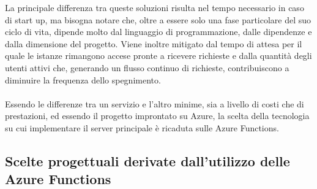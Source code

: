 La principale differenza tra queste soluzioni
risulta nel tempo necessario in caso di start up,
ma bisogna notare che,
oltre a essere solo una fase particolare del suo ciclo di vita,
dipende molto dal linguaggio di programmazione,
dalle dipendenze e dalla dimensione del progetto.
Viene inoltre mitigato dal tempo di attesa 
per il quale le istanze rimangono accese pronte a ricevere richieste e
dalla quantità degli utenti attivi che,
generando un flusso continuo di richieste,
contribuiscono a diminuire la frequenza dello spegnimento.\\
\\
Essendo le differenze tra un servizio e l'altro minime,
sia a livello di costi che di prestazioni,
ed essendo il progetto improntato su Azure,
la scelta della tecnologia su cui implementare il server principale
è ricaduta sulle Azure Functions.\\

\subsection{Scelte progettuali derivate dall'utilizzo delle Azure Functions}

